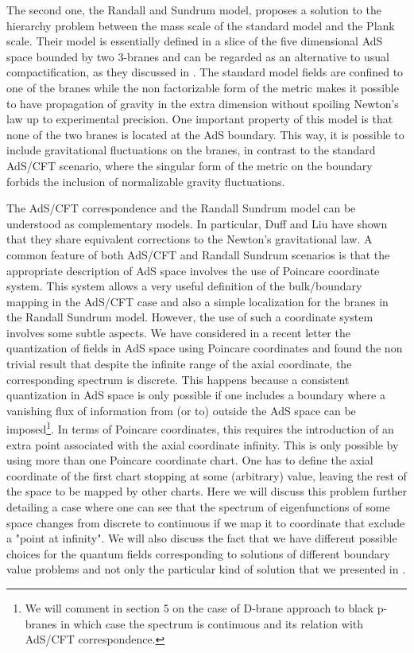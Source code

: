 \documentclass[a4paper,12pt]{article}
\begin{document}
The second one, the Randall and Sundrum model\cite{RS1},
proposes  a solution to the hierarchy problem 
 between the mass scale of the standard model and the Plank scale. 
Their model is essentially defined in a slice of the five dimensional 
AdS space bounded by  two 3-branes and can  be regarded as an
alternative to usual compactification, as they discussed in  \cite{RS2}.
The standard model fields are confined to one of the branes while the
non factorizable form of the metric makes it possible to have propagation 
of gravity in the extra dimension without spoiling Newton's law 
up to experimental precision.
One important property of this model is that none of the two
branes is located at the AdS boundary. This way, it is possible to
include gravitational fluctuations on the branes\cite{Ver},
in contrast to the standard AdS/CFT scenario, where the singular form 
of the metric on the boundary forbids the inclusion of normalizable 
gravity fluctuations. 

The  AdS/CFT correspondence and the Randall Sundrum model can be 
understood as complementary models.
In particular, Duff and  Liu have shown that they share equivalent 
corrections to the Newton's gravitational law\cite{DL}.
A common feature of both AdS/CFT and  Randall Sundrum scenarios 
is that the appropriate 
description of AdS space involves the use of Poincare coordinate system.
This system allows a very  useful definition 
of the bulk/boundary mapping in the AdS/CFT case  
and also  a simple localization for the branes in the Randall Sundrum model.
However, the use of such a coordinate system involves some subtle aspects.
We have considered in a recent letter the quantization of fields in
AdS space using Poincare coordinates \cite{BB} and found the non trivial
result that despite the infinite range of the axial coordinate,
the corresponding spectrum is discrete.
This happens because a consistent quantization in AdS space is only 
possible if one includes a boundary where a vanishing flux of
information from (or to) outside the AdS space 
can be imposed\footnote{We will comment in section 5 on the case of 
D-brane approach to   black p-branes in which case the spectrum 
is continuous and its relation with AdS/CFT correspondence.}. 
In terms of Poincare coordinates, this requires
the introduction of an extra point associated with the axial 
coordinate infinity.
This is only possible by using more than one Poincare coordinate chart.
One has to define the axial coordinate of the first chart stopping 
at some (arbitrary) value, leaving the rest of the space to be mapped 
by other charts.
Here we will discuss this problem further detailing a case where one
can see that the spectrum of eigenfunctions of some space changes 
from discrete to continuous if we map it to coordinate that 
exclude a "point at infinity".
We will also discuss the fact that we have different possible choices
for the quantum fields corresponding to solutions of different boundary 
value problems and not only the particular kind of solution that we 
presented  in \cite{BB}. 
\end{document}
